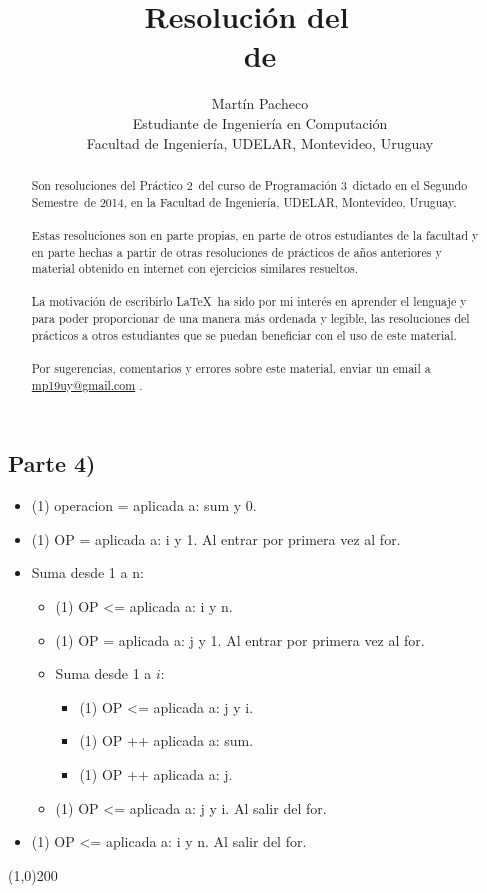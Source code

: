 \documentclass[letterpaper, fleqn]{report}
\title{Resolución del \practico\ \\de \materia}
\author{Martín Pacheco\\Estudiante de Ingeniería en Computación\\Facultad de Ingeniería, UDELAR, Montevideo, Uruguay}
\date{\anio}
\newcommand{\materia}{Programación 3}
\newcommand{\practico}{Práctico 2}
\newcommand{\facultad}{Facultad de Ingeniería}
\newcommand{\semestre}{Segundo Semestre}
\newcommand{\anio}{2014}
\begin{document}
\maketitle
\def\abstractname{ Sobre este documento...}
\begin{abstract}
  Son resoluciones del \practico\ del curso de \materia\ dictado en el \semestre\ de \anio, en la \facultad, UDELAR, Montevideo, Uruguay. 
  \\\\
  Estas resoluciones son en parte propias, en parte de otros estudiantes de la facultad y en parte hechas a partir de otras resoluciones de prácticos de años anteriores y material obtenido en internet con ejercicios similares resueltos.
  \\\\
  La motivación de escribirlo \LaTeX\ ha sido por mi interés en aprender el lenguaje y para poder proporcionar de una manera más ordenada y legible, las resoluciones del prácticos a otros estudiantes que se puedan beneficiar con el uso de este material.
  \\\\
  Por sugerencias, comentarios y errores sobre este material, enviar un email a \href{mailto:mp19uy@gmail.com}{mp19uy@gmail.com} .
\end{abstract}

\pagebreak
\subsection*{Parte 4)}
\begin{itemize}
  \item (1) operacion = aplicada a: sum y 0.
  \item (1) OP = aplicada a: i y 1. Al entrar por primera vez al for.
  \item Suma desde 1 a n:
  \begin{itemize}
    \item (1) OP <= aplicada a: i y n.
    \item (1) OP = aplicada a: j y 1. Al entrar por primera vez al for.
    \item Suma desde 1 a $i$:
      \begin{itemize}
        \item (1) OP <= aplicada a: j y i.
        \item (1) OP ++ aplicada a: sum.
        \item (1) OP ++ aplicada a: j.
      \end{itemize}
    \item (1) OP <= aplicada a: j y i. Al salir del for.
  \end{itemize}
\item (1) OP <= aplicada a: i y n. Al salir del for.
\end{itemize}
\line(1,0){200}
\end{document}
